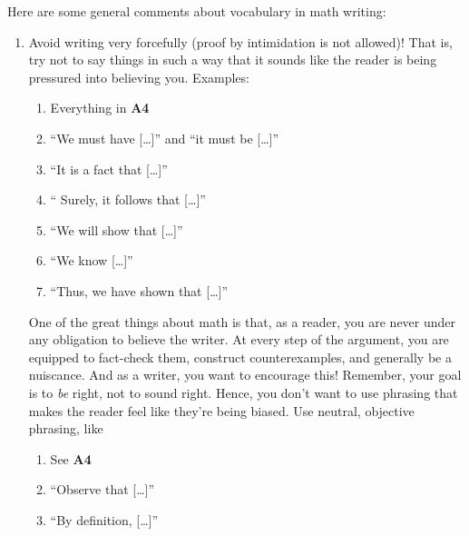 \documentclass{fkpset}
\begin{document}
\begin{problem}[A9]
  Here are some general comments about vocabulary in math writing:
  \begin{enumerate}
    \item Avoid writing very forcefully (proof by intimidation is not allowed)!
      That is, try not to say things in such a way that it sounds like the
      reader is being pressured into believing you. Examples:\vspace{.5em}
      \begin{enumerate}[label=\roman*)]
        \item Everything in \textbf{A4}\vspace{.5em}
        \item ``We {\color{red}must} have [\ldots]'' and ``it {\color{red}must}
          be [\ldots]''\vspace{.5em}
        \item ``It is a {\color{red} fact} that [\ldots]''\vspace{.5em}
        \item ``{\color{red} Surely}, it follows that [\ldots]''\vspace{.5em}
        \item ``We {\color{red} will} show that [\ldots]''\vspace{.5em}
        \item ``We {\color{red}know} [\ldots]''\vspace{.5em}
        \item ``Thus, {\color{red} we have shown that} [\ldots]''\vspace{.5em}
      \end{enumerate}
      One of the great things about math is that, as a reader, you are never
      under any obligation to believe the writer. At every step of the argument,
      you are equipped to fact-check them, construct counterexamples, and
      generally be a nuiscance. And as a writer, you want to encourage this!
      Remember, your goal is to \emph{be} right, not to sound right. Hence, you
      don't want to use phrasing that makes the reader feel like they're being
      biased. Use neutral, objective phrasing, like
      \begin{enumerate}[label=\roman*)]
        \item See \textbf{A4}
        \item ``{\color{blue}Observe that} [\ldots]''\vspace{.5em}
        \item ``{\color{blue}By definition}, [\ldots]''\vspace{.5em}

\end{enumerate}
\end{enumerate}
\end{problem}
\end{document}
